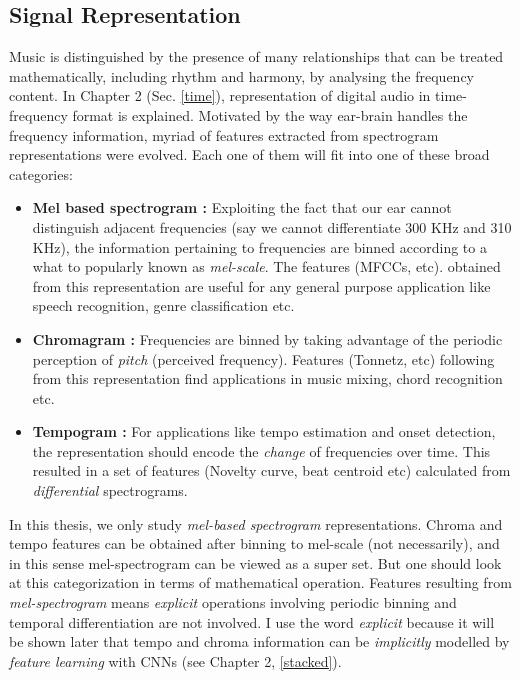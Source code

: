 \subsection{Signal Representation}
Music is distinguished by the presence of many relationships that can be treated mathematically, including rhythm and harmony, by analysing the frequency content. In Chapter 2 (Sec. \ref{time}), representation of digital audio in time-frequency format is explained. Motivated by the way ear-brain handles the frequency information, myriad of features extracted from spectrogram representations were evolved. Each one of them will fit into one of these broad categories:
\begin{itemize}
\setlength\itemsep{0em}
\item \textbf{Mel based spectrogram :} Exploiting the fact that our ear cannot distinguish adjacent frequencies (say we cannot differentiate 300 KHz and 310 KHz), the information pertaining to frequencies are binned according to a what to popularly known as \textit{mel-scale}. The features (MFCCs, etc). obtained from this representation are useful for any general purpose application like speech recognition, genre classification etc.    
\item \textbf{Chromagram :} Frequencies are binned by taking advantage of the periodic perception of \textit{pitch} (perceived frequency). Features (Tonnetz, etc) following from this representation find applications in music mixing, chord recognition etc. 
\item \textbf{Tempogram :} For applications like tempo estimation and onset detection, the representation should encode the \textit{change} of frequencies over time. This resulted in a set of features (Novelty curve, beat centroid etc) calculated from \textit{differential} spectrograms.  
\end{itemize} 
In this thesis, we only study \textit{mel-based spectrogram} representations. Chroma and tempo features can be obtained after binning to mel-scale (not necessarily), and in this sense mel-spectrogram can be viewed as a super set. But one should look at this categorization in terms of mathematical operation. Features resulting from \textit{mel-spectrogram} means \textit{explicit} operations involving periodic binning and temporal differentiation are not involved. I use the word \textit{explicit} because it will be shown later that tempo and chroma information can be \textit{implicitly} modelled by \textit{feature learning} with CNNs (see Chapter 2, \ref{stacked}).     
  
